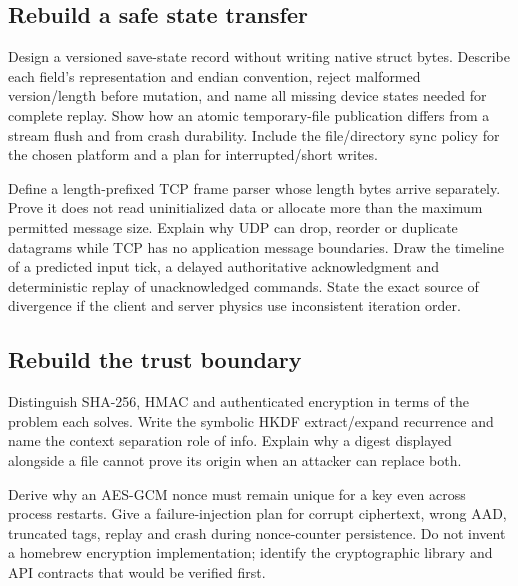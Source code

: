 \subsection{Rebuild a safe state transfer}\label{appendix-11f73b337e37-rebuild-a-safe-state-transfer}

\hypertarget{appendix-11f73b337e37-rebuild-a-safe-state-transfer}{}

Design a versioned save-state record without writing native struct bytes. Describe each field's representation and endian convention, reject malformed version/length before mutation, and name all missing device states needed for complete replay. Show how an atomic temporary-file publication differs from a stream flush and from crash durability. Include the file/directory sync policy for the chosen platform and a plan for interrupted/short writes.

Define a length-prefixed TCP frame parser whose length bytes arrive separately. Prove it does not read uninitialized data or allocate more than the maximum permitted message size. Explain why UDP can drop, reorder or duplicate datagrams while TCP has no application message boundaries. Draw the timeline of a predicted input tick, a delayed authoritative acknowledgment and deterministic replay of unacknowledged commands. State the exact source of divergence if the client and server physics use inconsistent iteration order.

\subsection{Rebuild the trust boundary}\label{appendix-11f73b337e37-rebuild-the-trust-boundary}

\hypertarget{appendix-11f73b337e37-rebuild-the-trust-boundary}{}

Distinguish SHA-256, HMAC and authenticated encryption in terms of the problem each solves. Write the symbolic HKDF extract/expand recurrence and name the context separation role of info. Explain why a digest displayed alongside a file cannot prove its origin when an attacker can replace both.

Derive why an AES-GCM nonce must remain unique for a key even across process restarts. Give a failure-injection plan for corrupt ciphertext, wrong AAD, truncated tags, replay and crash during nonce-counter persistence. Do not invent a homebrew encryption implementation; identify the cryptographic library and API contracts that would be verified first.

